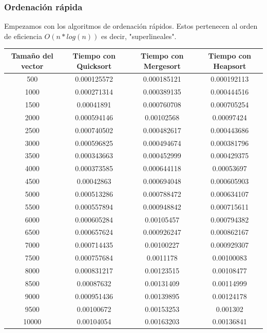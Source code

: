\documentclass{article}
\begin{document}
	\subsubsection{Ordenación rápida}
	Empezamos con los algoritmos de ordenación rápidos. Estos pertenecen al orden de eficiencia $O(n*log(n))$ es decir, "superlineales".
		\begin{longtable}{|c|c|c|c|}
			\hline
			Tamaño del vector & Tiempo con Quicksort & Tiempo con Mergesort & Tiempo con Heapsort \\ \hline
			500	     &  0.000125572	 &  0.000185121	 &  0.000192113  \\ \hline
			1000	 &  0.000271314	 &  0.000389135	 &  0.000444516  \\ \hline
			1500	 &  0.00041891	 &  0.000760708	 &  0.000705254  \\ \hline
			2000	 &  0.000594146	 &  0.00102568	 &  0.00097424  \\ \hline
			2500	 &  0.000740502	 &  0.000482617	 &  0.000443686  \\ \hline
			3000	 &  0.000596825	 &  0.000494674	 &  0.000381796  \\ \hline
			3500	 &  0.000343663	 &  0.000452999	 &  0.000429375  \\ \hline
			4000	 &  0.000373585	 &  0.000644118	 &  0.00053697  \\ \hline
			4500	 &  0.00042863	 &  0.000694048	 &  0.000605903  \\ \hline
			5000	 &  0.000513286	 &  0.000788472	 &  0.000634107  \\ \hline
			5500	 &  0.000557894	 &  0.000948842	 &  0.000715611  \\ \hline
			6000	 &  0.000605284	 &  0.00105457	 &  0.000794382  \\ \hline
			6500	 &  0.000657624	 &  0.000926247	 &  0.000862167  \\ \hline
			7000	 &  0.000714435	 &  0.00100227	 &  0.000929307  \\ \hline
			7500	 &  0.000757684	 &  0.0011178	 &  0.00100083  \\ \hline
			8000	 &  0.000831217	 &  0.00123515	 &  0.00108477  \\ \hline
			8500	 &  0.00087632	 &  0.00131409	 &  0.00114999  \\ \hline
			9000	 &  0.000951436	 &  0.00139895	 &  0.00124178  \\ \hline
			9500	 &  0.00100672	 &  0.00153253	 &  0.001302  \\ \hline
			10000	 &  0.00104054	 &  0.00163203	 &  0.00136841  \\ \hline

\end{longtable}
\end{document}
